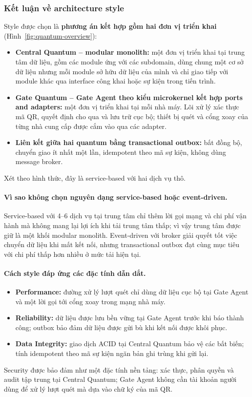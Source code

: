 \subsubsection{Kết luận về architecture style}\label{sec:style-decision}
Style được chọn là \textbf{phương án kết hợp gồm hai đơn vị triển khai} (Hình~\ref{fig:quantum-overview}):
\begin{itemize}
    \item \textbf{Central Quantum -- modular monolith:} một đơn vị triển khai tại trung tâm dữ liệu, gồm các module ứng với các subdomain, dùng chung một cơ sở dữ liệu nhưng mỗi module sở hữu dữ liệu của mình và chỉ giao tiếp với module khác qua interface công khai hoặc sự kiện trong tiến trình.
    \item \textbf{Gate Quantum -- Gate Agent theo kiểu microkernel kết hợp ports and adapters:} một đơn vị triển khai tại mỗi nhà máy. Lõi xử lý xác thực mã QR, quyết định cho qua và lưu trữ cục bộ; thiết bị quét và cổng xoay của từng nhà cung cấp được cắm vào qua các adapter.
    \item \textbf{Liên kết giữa hai quantum bằng transactional outbox:} bất đồng bộ, chuyển giao ít nhất một lần, idempotent theo mã sự kiện, không dùng message broker.
\end{itemize}
Xét theo hình thức, đây là service-based với hai dịch vụ thô.

\paragraph{Vì sao không chọn nguyên dạng service-based hoặc event-driven.} Service-based với 4--6 dịch vụ tại trung tâm chỉ thêm lời gọi mạng và chi phí vận hành mà không mang lại lợi ích khi tải trung tâm thấp; vì vậy trung tâm được giữ là một khối modular monolith. Event-driven với broker giải quyết tốt việc chuyển dữ liệu khi mất kết nối, nhưng transactional outbox đạt cùng mục tiêu với chi phí thấp hơn nhiều ở mức tải hiện tại.

\paragraph{Cách style đáp ứng các đặc tính dẫn dắt.}
\begin{itemize}
    \item \textbf{Performance:} đường xử lý lượt quét chỉ dùng dữ liệu cục bộ tại Gate Agent và một lời gọi tới cổng xoay trong mạng nhà máy.
    \item \textbf{Reliability:} dữ liệu được lưu bền vững tại Gate Agent trước khi báo thành công; outbox bảo đảm dữ liệu được gửi bù khi kết nối được khôi phục.
    \item \textbf{Data Integrity:} giao dịch ACID tại Central Quantum bảo vệ các bất biến; tính idempotent theo mã sự kiện ngăn bản ghi trùng khi gửi lại.
\end{itemize}
Security được bảo đảm như một đặc tính nền tảng: xác thực, phân quyền và audit tập trung tại Central Quantum; Gate Agent không cần tài khoản người dùng để xử lý lượt quét mà dựa vào chữ ký của mã QR.

